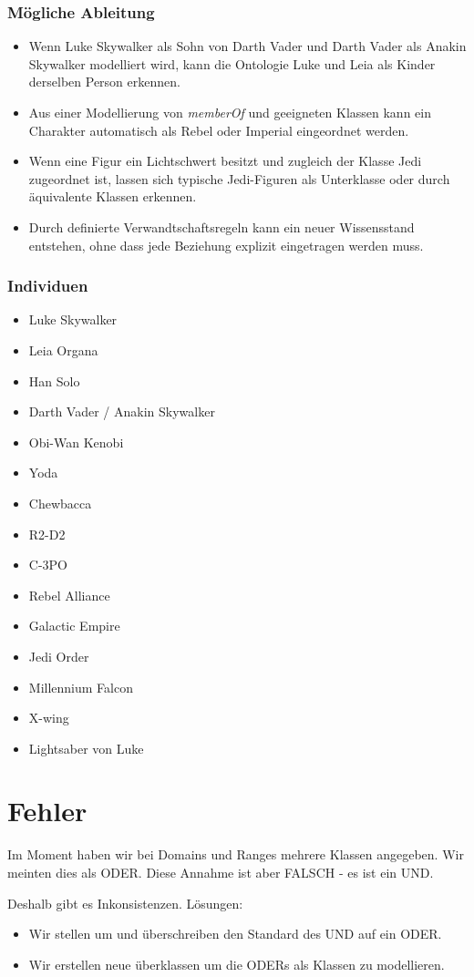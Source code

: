 \documentclass[a4paper]{article}
\begin{document}
\subsubsection{Mögliche Ableitung}

\begin{itemize}
    \item Wenn Luke Skywalker als Sohn von Darth Vader und Darth Vader als Anakin Skywalker modelliert wird, kann die Ontologie Luke und Leia als Kinder derselben Person erkennen.
    \item Aus einer Modellierung von \emph{memberOf} und geeigneten Klassen kann ein Charakter automatisch als Rebel oder Imperial eingeordnet werden.
    \item Wenn eine Figur ein Lichtschwert besitzt und zugleich der Klasse Jedi zugeordnet ist, lassen sich typische Jedi-Figuren als Unterklasse oder durch äquivalente Klassen erkennen.
    \item Durch definierte Verwandtschaftsregeln kann ein neuer Wissensstand entstehen, ohne dass jede Beziehung explizit eingetragen werden muss.
\end{itemize}

\subsubsection{Individuen}

\begin{itemize}
    \item Luke Skywalker
    \item Leia Organa
    \item Han Solo
    \item Darth Vader / Anakin Skywalker
    \item Obi-Wan Kenobi
    \item Yoda
    \item Chewbacca
    \item R2-D2
    \item C-3PO
    \item Rebel Alliance
    \item Galactic Empire
    \item Jedi Order
    \item Millennium Falcon
    \item X-wing
    \item Lightsaber von Luke
\end{itemize}

\newpage
\section{Fehler}

Im Moment haben wir bei Domains und Ranges mehrere Klassen angegeben. Wir meinten dies als ODER. Diese Annahme ist aber FALSCH - es ist ein UND.

Deshalb gibt es Inkonsistenzen. Lösungen:

\begin{itemize}
    \item Wir stellen um und überschreiben den Standard des UND auf ein ODER.
    \item Wir erstellen neue überklassen um die ODERs als Klassen zu modellieren.
\end{itemize}
\end{document}
